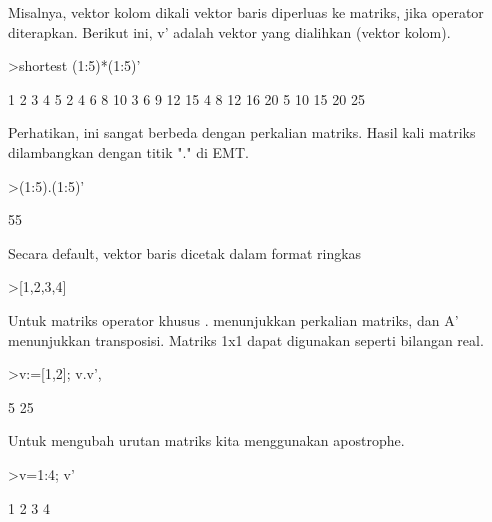 \documentclass{article}
\begin{document}
\begin{eulernotebook}
\begin{eulercomment}
\begin{eulercomment}
\begin{eulercomment}
\begin{eulercomment}
\begin{eulercomment}
\begin{eulercomment}
\begin{eulercomment}
Misalnya, vektor kolom dikali vektor baris diperluas ke matriks, jika
operator diterapkan. Berikut ini, v' adalah vektor yang dialihkan
(vektor kolom).
\end{eulercomment}
\begin{eulerprompt}
>shortest (1:5)*(1:5)'
\end{eulerprompt}
\begin{euleroutput}
       1      2      3      4      5 
       2      4      6      8     10 
       3      6      9     12     15 
       4      8     12     16     20 
       5     10     15     20     25 
\end{euleroutput}
\begin{eulercomment}
Perhatikan, ini sangat berbeda dengan perkalian matriks. Hasil kali
matriks dilambangkan dengan titik "." di EMT.
\end{eulercomment}
\begin{eulerprompt}
>(1:5).(1:5)'
\end{eulerprompt}
\begin{euleroutput}
  55
\end{euleroutput}
\begin{eulercomment}
Secara default, vektor baris dicetak dalam format ringkas
\end{eulercomment}
\begin{eulerprompt}
>[1,2,3,4]
\end{eulerprompt}
\begin{euleroutput}
  [1,  2,  3,  4]
\end{euleroutput}
\begin{eulercomment}
Untuk matriks operator khusus . menunjukkan perkalian matriks, dan A'
menunjukkan transposisi. Matriks 1x1 dapat digunakan seperti bilangan
real.
\end{eulercomment}
\begin{eulerprompt}
>v:=[1,2]; v.v', %
\end{eulerprompt}
\begin{euleroutput}
  5
  25
\end{euleroutput}
\begin{eulercomment}
Untuk mengubah urutan matriks kita menggunakan apostrophe.
\end{eulercomment}
\begin{eulerprompt}
>v=1:4; v'
\end{eulerprompt}
\begin{euleroutput}
              1 
              2 
              3 
              4 
\end{euleroutput}

\end{eulercomment}
\end{eulercomment}
\end{eulercomment}
\end{eulercomment}
\end{eulercomment}
\end{eulercomment}
\end{eulernotebook}
\end{document}
